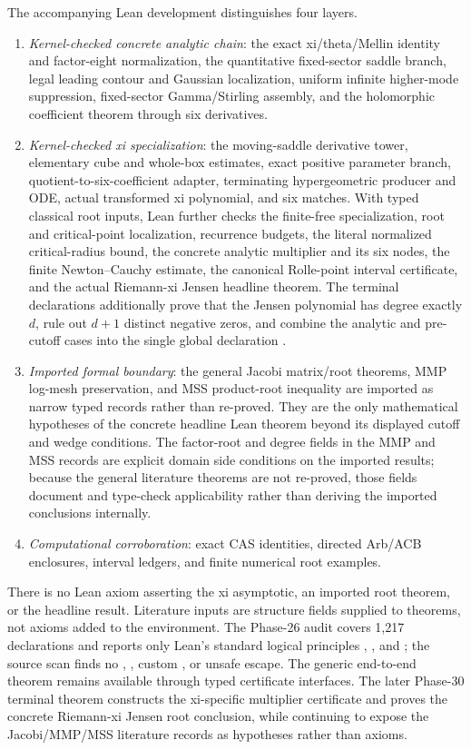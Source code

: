 \documentclass[12pt]{article}
\begin{document}
The accompanying Lean development distinguishes four layers.
\begin{enumerate}
\item \emph{Kernel-checked concrete analytic chain}: the exact
xi/theta/Mellin identity and factor-eight normalization, the quantitative
fixed-sector saddle branch, legal leading contour and Gaussian localization,
uniform infinite higher-mode suppression, fixed-sector Gamma/Stirling
assembly, and the holomorphic coefficient theorem through six derivatives.
\item \emph{Kernel-checked xi specialization}: the moving-saddle derivative
tower, elementary cube and whole-box estimates, exact positive parameter
branch, quotient-to-six-coefficient adapter, terminating hypergeometric
producer and ODE, actual transformed xi polynomial, and six matches.  With
typed classical root inputs, Lean further checks the finite-free
specialization, root and critical-point localization, recurrence budgets,
the literal normalized critical-radius bound, the concrete analytic
multiplier and its six nodes, the finite Newton--Cauchy estimate, the
canonical Rolle-point interval certificate, and the actual Riemann-xi Jensen
headline theorem.  The terminal declarations additionally prove that the
Jensen polynomial has degree exactly $d$, rule out $d+1$ distinct negative
zeros, and combine the analytic and pre-cutoff cases into the single global
declaration
.
\item \emph{Imported formal boundary}: the general Jacobi matrix/root
theorems, MMP log-mesh preservation, and MSS product-root inequality are
imported as narrow typed records rather than re-proved.  They are the only
mathematical hypotheses of the concrete headline Lean theorem beyond its
displayed cutoff and wedge conditions.  The factor-root and degree fields in
the MMP and MSS records are explicit domain side conditions on the imported
results; because the general literature theorems are not re-proved, those
fields document and type-check applicability rather than deriving the
imported conclusions internally.
\item \emph{Computational corroboration}: exact CAS identities, directed
Arb/ACB enclosures, interval ledgers, and finite numerical root examples.
\end{enumerate}

There is no Lean axiom asserting the xi asymptotic, an imported root theorem,
or the headline result.  Literature inputs are structure fields supplied to
theorems, not axioms added to the environment.  The Phase-26 audit covers
1,217 declarations and reports only Lean's standard logical principles
, , and ; the source
scan finds no , , custom , or unsafe
escape.  The generic end-to-end theorem remains available through typed
certificate interfaces.  The later Phase-30 terminal theorem constructs the
xi-specific multiplier certificate and proves the concrete Riemann-xi Jensen
root conclusion, while continuing to expose the Jacobi/MMP/MSS literature
records as hypotheses rather than axioms.
\end{document}
